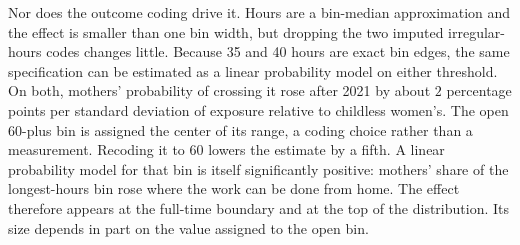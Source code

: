 \documentclass[12pt,a4paper]{article}
\begin{document}
\noindent Nor does the outcome coding drive it. Hours are a bin-median approximation and the effect is
smaller than one bin width, but dropping the two imputed irregular-hours codes changes little.
Because 35 and 40 hours are exact bin edges, the same specification can be estimated as a linear
probability model on either threshold. On both, mothers' probability of crossing it rose after
2021 by about $2$ percentage points per standard deviation of exposure relative to childless
women's. The open $60$-plus bin is assigned the center of its range, a coding choice rather than
a measurement. Recoding it to $60$ lowers the estimate by a fifth. A linear probability model for
that bin is itself significantly positive: mothers' share of the longest-hours bin rose where the
work can be done from home. The effect therefore appears at the full-time boundary and at the top
of the distribution. Its size depends in part on the value assigned to the open bin.
\end{document}
